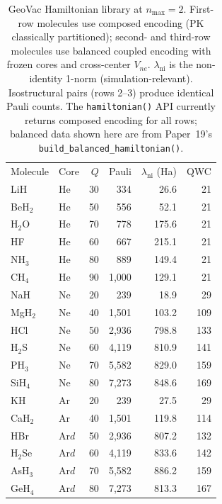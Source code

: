 \documentclass[twocolumn,pra,amsmath,amssymb,superscriptaddress]{revtex4-2}
\begin{document}
\begin{table}[h]
\caption{GeoVac Hamiltonian library at $n_{\max}=2$.  First-row
  molecules use composed encoding (PK classically partitioned);
  second- and third-row molecules use balanced coupled encoding
  with frozen cores and cross-center $V_{ne}$.
  $\lambda_{\text{ni}}$ is the non-identity 1-norm (simulation-relevant).
  Isostructural pairs (rows 2--3) produce identical Pauli counts.
  The \texttt{hamiltonian()} API currently returns composed encoding
  for all rows; balanced data shown here are from Paper~19's
  \texttt{build\_balanced\_hamiltonian()}.}
\label{tab:molecules}
\begin{ruledtabular}
\begin{tabular}{llrrrr}
Molecule & Core & $Q$ & Pauli & $\lambda_{\text{ni}}$ (Ha) & QWC \\
\colrule
LiH      & He   & 30 &    334 &  26.6 & 21 \\
BeH$_2$  & He   & 50 &    556 &  52.1 & 21 \\
H$_2$O   & He   & 70 &    778 & 175.6 & 21 \\
HF       & He   & 60 &    667 & 215.1 & 21 \\
NH$_3$   & He   & 80 &    889 & 149.4 & 21 \\
CH$_4$   & He   & 90 & 1{,}000 & 129.1 & 21 \\
\colrule
NaH      & Ne   & 20 &    239 &  18.9 &  29 \\
MgH$_2$  & Ne   & 40 & 1{,}501 & 103.2 & 109 \\
HCl      & Ne   & 50 & 2{,}936 & 798.8 & 133 \\
H$_2$S   & Ne   & 60 & 4{,}119 & 810.9 & 141 \\
PH$_3$   & Ne   & 70 & 5{,}582 & 829.0 & 159 \\
SiH$_4$  & Ne   & 80 & 7{,}273 & 848.6 & 169 \\
\colrule
KH       & Ar   & 20 &    239 &  27.5 &  29 \\
CaH$_2$  & Ar   & 40 & 1{,}501 & 119.8 & 114 \\
HBr      & Ar$d$ & 50 & 2{,}936 & 807.2 & 132 \\
H$_2$Se  & Ar$d$ & 60 & 4{,}119 & 833.6 & 142 \\
AsH$_3$  & Ar$d$ & 70 & 5{,}582 & 886.2 & 159 \\
GeH$_4$  & Ar$d$ & 80 & 7{,}273 & 813.3 & 167 \\
\end{tabular}
\end{ruledtabular}
\end{table}
\end{document}
